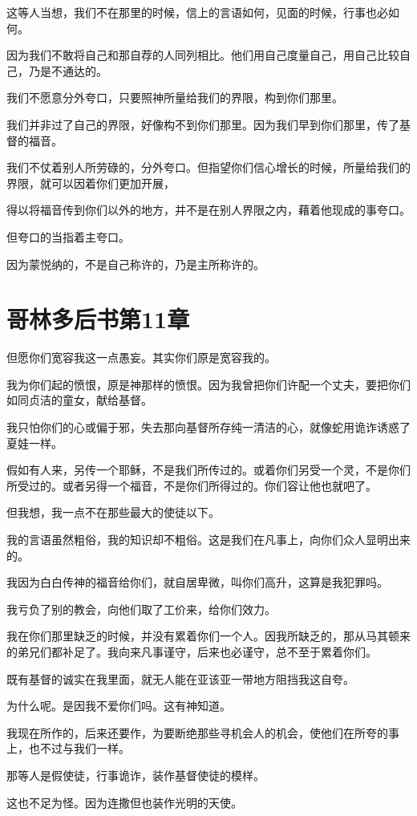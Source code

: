 \documentclass[12pt,oneside]{book}
\begin{document}
这等人当想，我们不在那里的时候，信上的言语如何，见面的时候，行事也必如何。

因为我们不敢将自己和那自荐的人同列相比。他们用自己度量自己，用自己比较自己，乃是不通达的。

我们不愿意分外夸口，只要照神所量给我们的界限，构到你们那里。

我们并非过了自己的界限，好像构不到你们那里。因为我们早到你们那里，传了基督的福音。

我们不仗着别人所劳碌的，分外夸口。但指望你们信心增长的时候，所量给我们的界限，就可以因着你们更加开展，

得以将福音传到你们以外的地方，并不是在别人界限之内，藉着他现成的事夸口。

但夸口的当指着主夸口。

因为蒙悦纳的，不是自己称许的，乃是主所称许的。

\chapter{哥林多后书第11章}
但愿你们宽容我这一点愚妄。其实你们原是宽容我的。

我为你们起的愤恨，原是神那样的愤恨。因为我曾把你们许配一个丈夫，要把你们如同贞洁的童女，献给基督。

我只怕你们的心或偏于邪，失去那向基督所存纯一清洁的心，就像蛇用诡诈诱惑了夏娃一样。

假如有人来，另传一个耶稣，不是我们所传过的。或着你们另受一个灵，不是你们所受过的。或者另得一个福音，不是你们所得过的。你们容让他也就吧了。

但我想，我一点不在那些最大的使徒以下。

我的言语虽然粗俗，我的知识却不粗俗。这是我们在凡事上，向你们众人显明出来的。

我因为白白传神的福音给你们，就自居卑微，叫你们高升，这算是我犯罪吗。

我亏负了别的教会，向他们取了工价来，给你们效力。

我在你们那里缺乏的时候，并没有累着你们一个人。因我所缺乏的，那从马其顿来的弟兄们都补足了。我向来凡事谨守，后来也必谨守，总不至于累着你们。

既有基督的诚实在我里面，就无人能在亚该亚一带地方阻挡我这自夸。

为什么呢。是因我不爱你们吗。这有神知道。

我现在所作的，后来还要作，为要断绝那些寻机会人的机会，使他们在所夸的事上，也不过与我们一样。

那等人是假使徒，行事诡诈，装作基督使徒的模样。

这也不足为怪。因为连撒但也装作光明的天使。
\end{document}
